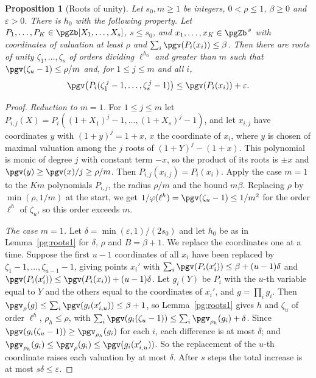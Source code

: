 \documentclass[10pt]{amsart}
\newtheorem{proposition}[theorem]{Proposition}
\theoremstyle{definition}
\theoremstyle{remark}
\begin{document}
\begin{proposition}[Roots of unity]\label{pg:roots}
Let $s_0,m\ge1$ be integers, $0<\rho\le1$, $\beta\ge0$ and $\varepsilon>0$. There is $h_0$ with the
following property. Let $P_1,\dots,P_K\in\pgZb[X_1,\dots,X_s]$, $s\le s_0$, and
$x_1,\dots,x_K\in\pgZb^{\,s}$ with coordinates of valuation at least $\rho$ and
$\sum_i\pgv(P_i(x_i))\le\beta$. Then there are roots of unity $\zeta_1,\dots,\zeta_s$ of orders
dividing $\ell^{h_0}$ and greater than $m$ such that $\pgv(\zeta_u-1)\le\rho/m$ and, for
$1\le j\le m$ and all $i$,
\[
\pgv\bigl(P_i(\zeta_1^{\,j}-1,\dots,\zeta_s^{\,j}-1)\bigr)\le\pgv(P_i(x_i))+\varepsilon .
\]
\end{proposition}
\begin{proof}
\emph{Reduction to $m=1$.} For $1\le j\le m$ let $P_{i,j}(X)=P_i((1+X_1)^j-1,\dots,(1+X_s)^j-1)$,
and let $x_{i,j}$ have coordinates $y$ with $(1+y)^j=1+x$, $x$ the coordinate of $x_i$, where
$y$ is chosen of maximal valuation among the $j$ roots of $(1+Y)^j-(1+x)$. This polynomial is
monic of degree $j$ with constant term $-x$, so the product of its roots is $\pm x$ and
$\pgv(y)\ge\pgv(x)/j\ge\rho/m$. Then $P_{i,j}(x_{i,j})=P_i(x_i)$. Apply the case $m=1$ to the $Km$
polynomials $P_{i,j}$, the radius $\rho/m$ and the bound $m\beta$. Replacing $\rho$ by $\min(\rho,1/m)$ at the start, we get $1/\varphi(\ell^h)=\pgv(\zeta_u-1)\le
1/m^2$ for the order $\ell^h$ of $\zeta_u$, so this order exceeds $m$.

\emph{The case $m=1$.} Let $\delta=\min(\varepsilon,1)/(2s_0)$ and let $h_0$ be as in
Lemma~\ref{pg:roots1} for $\delta$, $\rho$ and $B=\beta+1$. We replace the coordinates one at a
time. Suppose the first $u-1$ coordinates of all $x_i$ have been replaced by $\zeta_1-1,\dots,
\zeta_{u-1}-1$, giving points $x_i'$ with $\sum_i\pgv(P_i(x'_i))\le\beta+(u-1)\delta$ and
$\pgv(P_i(x_i'))\le\pgv(P_i(x_i))+(u-1)\delta$. Let $g_i(Y)$ be $P_i$ with the $u$-th variable
equal to $Y$ and the others equal to the coordinates of $x_i'$, and $g=\prod_ig_i$. Then
$\pgv_\rho(g)\le\sum_i\pgv(g_i(x'_{i,u}))\le\beta+1$, so Lemma~\ref{pg:roots1} gives $h$ and
$\zeta_u$ of order $\ell^h$, $\rho_h\le\rho$, with $\sum_i\pgv(g_i(\zeta_u-1))\le\sum_i\pgv_{
\rho_h}(g_i)+\delta$. Since $\pgv(g_i(\zeta_u-1))\ge\pgv_{\rho_h}(g_i)$ for each $i$, each
difference is at most $\delta$; and $\pgv_{\rho_h}(g_i)\le\pgv_{\rho}(g_i)\le\pgv(g_i(x'_{i,u}))$.
So the replacement of the $u$-th coordinate raises each valuation by at most $\delta$. After $s$
steps the total increase is at most $s\delta\le\varepsilon$.
\end{proof}
\end{document}
